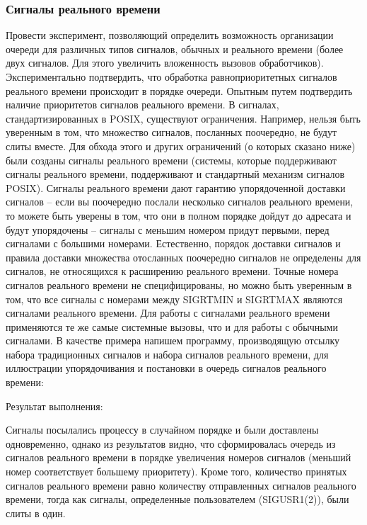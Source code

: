 \documentclass[a4paper]{article}
\begin{document}
	\subsubsection{Сигналы реального времени}
	Провести эксперимент, позволяющий определить возможность организации очереди для различных типов сигналов, обычных и реального времени (более двух сигналов. Для этого увеличить вложенность вызовов обработчиков).
	Экспериментально подтвердить, что обработка равноприоритетных сигналов реального времени происходит в порядке очереди.
	Опытным путем подтвердить наличие приоритетов сигналов реального времени.
	В сигналах, стандартизированных в POSIX, существуют ограничения. Например, нельзя быть уверенным в том, что множество сигналов, посланных поочередно, не будут слиты вместе.
	Для обхода этого и других ограничений (о которых сказано ниже) были созданы сигналы реального времени (системы, которые поддерживают сигналы реального времени, поддерживают и стандартный механизм сигналов POSIX).
	Сигналы реального времени дают гарантию упорядоченной доставки сигналов – если вы поочередно послали несколько сигналов реального времени, то можете быть уверены в том, что они в полном порядке дойдут до адресата и будут упорядочены – сигналы с меньшим номером придут первыми, перед сигналами с большими номерами. 
	Естественно, порядок доставки сигналов и правила доставки множества отосланных поочередно сигналов не определены для сигналов, не относящихся к расширению реального времени. 
	Точные номера сигналов реального времени не специфицированы, но можно быть уверенным в том, что все сигналы с номерами между SIGRTMIN и SIGRTMAX являются сигналами реального времени. 
	Для работы с сигналами реального времени применяются те же самые системные вызовы, что и для работы с обычными сигналами. 
	В качестве примера напишем программу, производящую отсылку набора традиционных сигналов и набора сигналов реального времени, для иллюстрации упорядочивания и постановки в очередь сигналов реального времени:

	
	
	Результат выполнения:
	

	Сигналы посылались процессу в случайном порядке и были доставлены одновременно, однако из результатов видно, что сформировалась очередь из сигналов реального времени в порядке увеличения номеров сигналов (меньший номер соответствует большему приоритету).  Кроме того, количество принятых сигналов реального времени равно количеству отправленных сигналов реального времени, тогда как сигналы, определенные пользователем (SIGUSR1(2)), были слиты в один.
\end{document}
